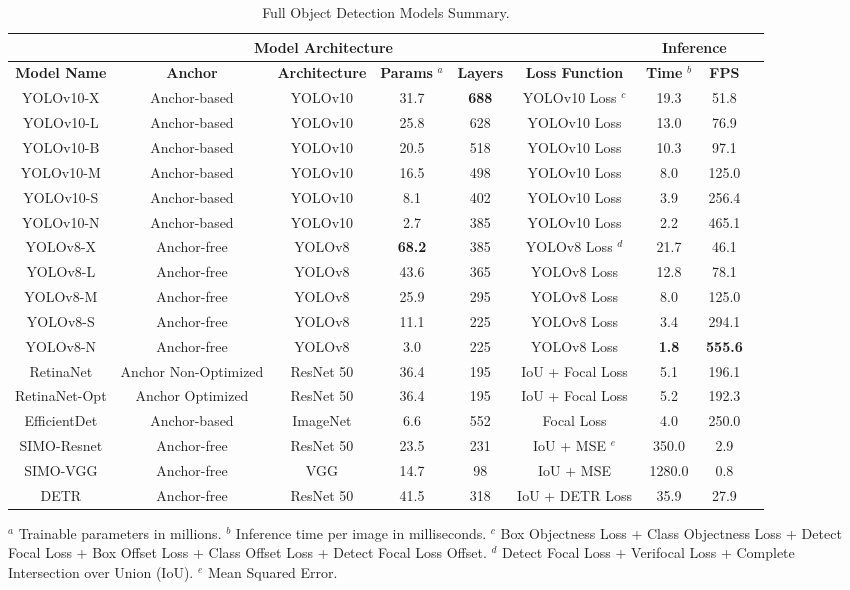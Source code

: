 \begin{table*}[h]
\centering
\caption{Full Object Detection Models Summary.}
\label{fig:modelsummary}
\begin{tabular}{|c|c|c|c|c|c|c|c|c|}
\hline
\multicolumn{6}{|c|}{\textbf{Model Architecture}} & \multicolumn{2}{c|}{\textbf{Inference}} \\
\hline
\textbf{Model Name} & \textbf{Anchor} & \textbf{Architecture} & \textbf{Params} $^a$ & \textbf{Layers} & \textbf{Loss Function} & \textbf{Time}  $^b$ & \textbf{FPS} \\
\hline
YOLOv10-X & Anchor-based & YOLOv10 & 31.7 & \textbf{688} & YOLOv10 Loss $^c$ & 19.3 & 51.8  \\ 
YOLOv10-L & Anchor-based & YOLOv10 & 25.8 & 628 & YOLOv10 Loss & 13.0 & 76.9  \\ 
YOLOv10-B & Anchor-based & YOLOv10 & 20.5 & 518 & YOLOv10 Loss & 10.3 & 97.1  \\ 
YOLOv10-M & Anchor-based & YOLOv10 & 16.5 & 498 & YOLOv10 Loss & 8.0 & 125.0  \\ 
YOLOv10-S & Anchor-based & YOLOv10 & 8.1 & 402 & YOLOv10 Loss & 3.9 & 256.4  \\ 
YOLOv10-N & Anchor-based & YOLOv10 & 2.7 & 385 & YOLOv10 Loss & 2.2 & 465.1  \\ 
YOLOv8-X & Anchor-free & YOLOv8 & \textbf{68.2} & 385 & YOLOv8 Loss $^d$ & 21.7 & 46.1  \\ 
YOLOv8-L & Anchor-free & YOLOv8 & 43.6 & 365 & YOLOv8 Loss & 12.8 & 78.1  \\ 
YOLOv8-M & Anchor-free & YOLOv8 & 25.9 & 295 & YOLOv8 Loss & 8.0 & 125.0  \\ 
YOLOv8-S & Anchor-free & YOLOv8 & 11.1 & 225 & YOLOv8 Loss & 3.4 & 294.1  \\ 
YOLOv8-N & Anchor-free & YOLOv8 & 3.0 & 225 & YOLOv8 Loss & \textbf{1.8} & \textbf{555.6}  \\ 
RetinaNet & Anchor Non-Optimized & ResNet 50 & 36.4 & 195 & IoU + Focal Loss & 5.1 & 196.1  \\ 
RetinaNet-Opt & Anchor Optimized & ResNet 50 & 36.4 & 195 & IoU + Focal Loss & 5.2 & 192.3  \\ 
EfficientDet & Anchor-based & ImageNet & 6.6 & 552 & Focal Loss & 4.0 & 250.0  \\ 
SIMO-Resnet & Anchor-free & ResNet 50 & 23.5 & 231 & IoU + MSE $^e$ & 350.0 & 2.9  \\ 
SIMO-VGG & Anchor-free & VGG & 14.7 & 98 & IoU + MSE & 1280.0 & 0.8  \\ 
DETR & Anchor-free & ResNet 50 & 41.5 & 318 & IoU + DETR Loss & 35.9 & 27.9  \\ 
\hline
\end{tabular}
\newline
\footnotesize{$^a$ Trainable parameters in millions. $^b$ Inference time per image in milliseconds. $^c$ Box Objectness Loss + Class Objectness Loss + Detect Focal Loss + Box Offset Loss + Class Offset Loss + Detect Focal Loss Offset. $^d$ Detect Focal Loss + Verifocal Loss + Complete Intersection over Union (IoU). $^e$ Mean Squared Error.}
\end{table*}

